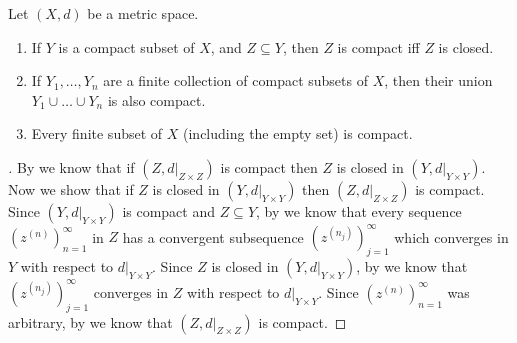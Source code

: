 \begin{thm}\label{ii:1.5.10}
  Let \((X, d)\) be a metric space.
  \begin{enumerate}
    \item\label{ii:1.5.10.a} If \(Y\) is a compact subset of \(X\), and \(Z \subseteq Y\), then \(Z\) is compact iff \(Z\) is closed.
    \item\label{ii:1.5.10.b} If \(Y_1, \dots, Y_n\) are a finite collection of compact subsets of \(X\), then their union \(Y_1 \cup \dots \cup Y_n\) is also compact.
    \item\label{ii:1.5.10.c} Every finite subset of \(X\) (including the empty set) is compact.
  \end{enumerate}
\end{thm}

\begin{proof}[]
  By  we know that if \((Z, d|_{Z \times Z})\) is compact then \(Z\) is closed in \((Y, d|_{Y \times Y})\).
  Now we show that if \(Z\) is closed in \((Y, d|_{Y \times Y})\) then \((Z, d|_{Z \times Z})\) is compact.
  Since \((Y, d|_{Y \times Y})\) is compact and \(Z \subseteq Y\), by  we know that every sequence \((z^{(n)})_{n = 1}^\infty\) in \(Z\) has a convergent subsequence \((z^{(n_j)})_{j = 1}^\infty\) which converges in \(Y\) with respect to \(d|_{Y \times Y}\).
  Since \(Z\) is closed in \((Y, d|_{Y \times Y})\), by  we know that \((z^{(n_j)})_{j = 1}^\infty\) converges in \(Z\) with respect to \(d|_{Y \times Y}\).
  Since \((z^{(n)})_{n = 1}^\infty\) was arbitrary, by  we know that \((Z, d|_{Z \times Z})\) is compact.
\end{proof}

